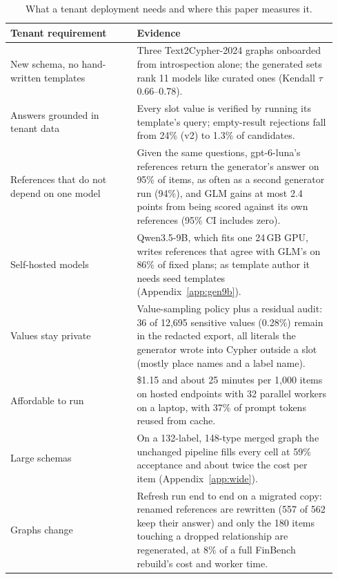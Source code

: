 \begin{table}[H]
\centering\small
\begin{tabular}{@{}p{0.36\linewidth}p{0.58\linewidth}@{}}
\toprule
Tenant requirement & Evidence \\
\midrule
New schema, no hand-written templates & Three Text2Cypher-2024 graphs onboarded from introspection alone; the generated sets rank 11 models like curated ones (Kendall $\tau$ 0.66--0.78). \\
Answers grounded in tenant data & Every slot value is verified by running its template's query; empty-result rejections fall from 24\% (v2) to 1.3\% of candidates. \\
References that do not depend on one model & Given the same questions, gpt-6-luna's references return the generator's answer on 95\% of items, as often as a second generator run (94\%), and GLM gains at most 2.4 points from being scored against its own references (95\% CI includes zero). \\
Self-hosted models & Qwen3.5-9B, which fits one 24\,GB GPU, writes references that agree with GLM's on 86\% of fixed plans; as template author it needs seed templates (Appendix~\ref{app:gen9b}). \\
Values stay private & Value-sampling policy plus a residual audit: 36 of 12,695 sensitive values (0.28\%) remain in the redacted export, all literals the generator wrote into Cypher outside a slot (mostly place names and a label name). \\
Affordable to run & \$1.15 and about 25 minutes per 1,000 items on hosted endpoints with 32 parallel workers on a laptop, with 37\% of prompt tokens reused from cache. \\
Large schemas & On a 132-label, 148-type merged graph the unchanged pipeline fills every cell at 59\% acceptance and about twice the cost per item (Appendix~\ref{app:wide}). \\
Graphs change & Refresh run end to end on a migrated copy: renamed references are rewritten (557 of 562 keep their answer) and only the 180 items touching a dropped relationship are regenerated, at 8\% of a full FinBench rebuild's cost and worker time. \\
\bottomrule
\end{tabular}
\caption{What a tenant deployment needs and where this paper measures it.}
\label{tab:tenant_evidence}
\end{table}

